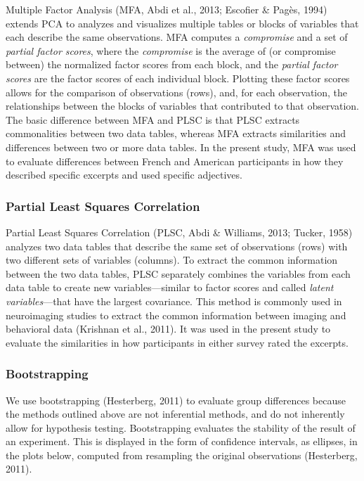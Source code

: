 \documentclass[
  english,
  man]{apa6}
\begin{document}
Multiple Factor Analysis (MFA, Abdi et al., 2013; Escofier \& Pagès, 1994) extends PCA to analyzes and visualizes multiple tables or blocks of variables that each describe the same observations. MFA computes a \emph{compromise} and a set of \emph{partial factor scores}, where the \emph{compromise} is the average of (or compromise between) the normalized factor scores from each block, and the \emph{partial factor scores} are the factor scores of each individual block. Plotting these factor scores allows for the comparison of observations (rows), and, for each observation, the relationships between the blocks of variables that contributed to that observation. The basic difference between MFA and PLSC is that PLSC extracts commonalities between two data tables, whereas MFA extracts similarities and differences between two or more data tables. In the present study, MFA was used to evaluate differences between French and American participants in how they described specific excerpts and used specific adjectives.

\hypertarget{partial-least-squares-correlation}{%
\subsubsection{Partial Least Squares Correlation}\label{partial-least-squares-correlation}}

Partial Least Squares Correlation (PLSC, Abdi \& Williams, 2013; Tucker, 1958) analyzes two data tables that describe the same set of observations (rows) with two different sets of variables (columns). To extract the common information between the two data tables, PLSC separately combines the variables from each data table to create new variables---similar to factor scores and called \emph{latent variables}---that have the largest covariance. This method is commonly used in neuroimaging studies to extract the common information between imaging and behavioral data (Krishnan et al., 2011). It was used in the present study to evaluate the similarities in how participants in either survey rated the excerpts.

\hypertarget{bootstrapping}{%
\subsubsection{Bootstrapping}\label{bootstrapping}}

We use bootstrapping (Hesterberg, 2011) to evaluate group differences because the methods outlined above are not inferential methods, and do not inherently allow for hypothesis testing. Bootstrapping evaluates the stability of the result of an experiment. This is displayed in the form of confidence intervals, as ellipses, in the plots below, computed from resampling the original observations (Hesterberg, 2011).
\end{document}
